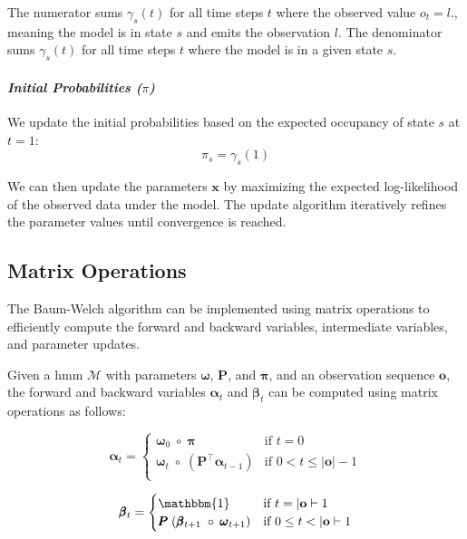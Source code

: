 The numerator sums $\gamma_s(t)$ for all time steps $t$ where the observed value $o_t = l$., meaning the model is in state $s$ and emits the observation $l$.
The denominator sums $\gamma_s(t)$ for all time steps $t$ where the model is in a given state $s$.


\paragraph*{\textit{Initial Probabilities ($\pi$)}}

We update the initial probabilities based on the expected occupancy of state $s$ at $t = 1$:
\begin{equation}
    \pi_s = \gamma_s(1)
    \label{eq:initial-probabilities}
\end{equation}

We can then update the parameters $\mathbf{x}$ by maximizing the expected log-likelihood of the observed data under the model.
The update algorithm iteratively refines the parameter values until convergence is reached.

\subsection{Matrix Operations}\label{subsec:matrix-operations}
The Baum-Welch algorithm can be implemented using matrix operations to efficiently compute the forward and backward variables, intermediate variables, and parameter updates.

Given a \gls{hmm} $\mathcal{M}$ with parameters $\pmb{\omega}$, $\pmb{P}$, and $\pmb{\pi}$, and an observation sequence $\mathbf{o}$, the forward and backward variables $\pmb{\alpha}_t$ and $\pmb{\beta}_t$ can be computed using matrix operations as follows:

\begin{equation}
    \label{eq:alpha}
    \pmb{\alpha}_t =
    \begin{cases}
        \pmb{\omega}_0 \; \circ \; \pmb{\pi}   & \text{if } t = 0    \\
        \pmb{\omega}_t \; \circ \; \left( \pmb{P}^\top \pmb{\alpha}_{t - 1} \right)   & \text{if } 0 < t \leq |\mathbf{o}|-1 \\
    \end{cases}
\end{equation}


\begin{equation}
    \label{eq:beta}
    \pmb{\beta}_t =
    \begin{cases}
        \mathbbm{1} & \text{if } t = |\mathbf{o}|-1        \\
        \pmb{P} \; (\pmb{\beta}_{t + 1} \; \circ \; \pmb{\omega}_{t + 1}) & \text{if } 0 \leq t < |\mathbf{o}|-1 \\
    \end{cases}
\end{equation}

